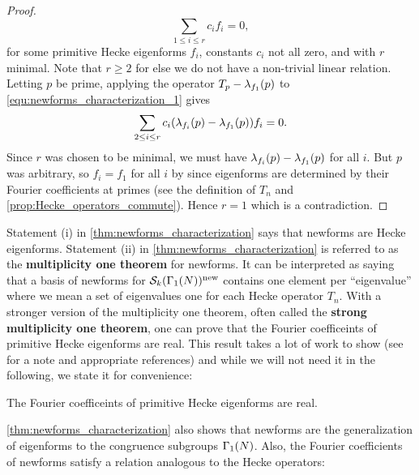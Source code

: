 \begin{proof}
        \begin{equation}\label{equ:newforms_characterization_1}
          \sum_{1 \le i \le r}c_{i}f_{i} = 0,
        \end{equation}
        for some primitive Hecke eigenforms $f_{i}$, constants $c_{i}$ not all zero, and with $r$ minimal. Note that $r \ge 2$ for else we do not have a non-trivial linear relation. Letting $p$ be prime, applying the operator $T_{p}-\lambda_{f_{1}}(p)$ to \cref{equ:newforms_characterization_1} gives
        \[
          \sum_{2 \le i \le r}c_{i}(\lambda_{f_{i}}(p)-\lambda_{f_{1}}(p))f_{i} = 0.
        \]
        Since $r$ was chosen to be minimal, we must have $\lambda_{f_{i}}(p)-\lambda_{f_{1}}(p)$ for all $i$. But $p$ was arbitrary, so $f_{i} = f_{1}$ for all $i$ by since eigenforms are determined by their Fourier coefficients at primes (see the definition of $T_{n}$ and \cref{prop:Hecke_operators_commute}). Hence $r = 1$ which is a contradiction.
      \end{proof}

      Statement (i) in \cref{thm:newforms_characterization} says that newforms are Hecke eigenforms. Statement (ii) in \cref{thm:newforms_characterization} is referred to as the \textbf{multiplicity one theorem} for newforms. It can be interpreted as saying that a basis of newforms for $\mathcal{S}_{k}(\Gamma_{1}(N))^{\mathrm{new}}$ contains one element per ``eigenvalue'' where we mean a set of eigenvalues one for each Hecke operator $T_{n}$. With a stronger version of the multiplicity one theorem, often called the \textbf{strong multiplicity one theorem}, one can prove that the Fourier coefficeints of primitive Hecke eigenforms are real. This result takes a lot of work to show (see \cite{diamond2005first} for a note and appropriate references) and while we will not need it in the following, we state it for convenience:

      \begin{theorem}
        The Fourier coefficeints of primitive Hecke eigenforms are real.
      \end{theorem}
      
        \cref{thm:newforms_characterization} also shows that newforms are the generalization of eigenforms to the congruence subgroups $\Gamma_{1}(N)$. Also, the Fourier coefficients of newforms satisfy a relation analogous to the Hecke operators:

